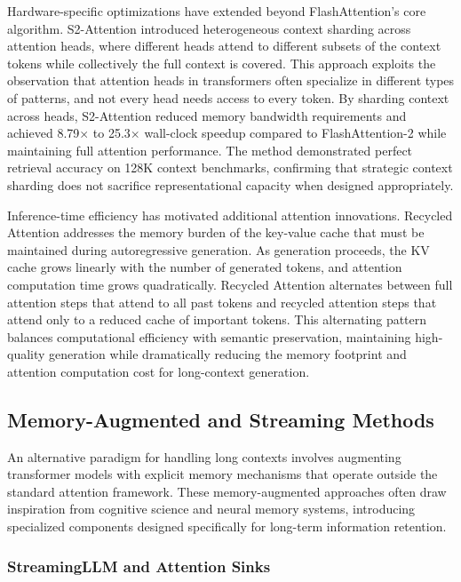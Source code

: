 Hardware-specific optimizations have extended beyond FlashAttention's core algorithm. S2-Attention introduced heterogeneous context sharding across attention heads, where different heads attend to different subsets of the context tokens while collectively the full context is covered. This approach exploits the observation that attention heads in transformers often specialize in different types of patterns, and not every head needs access to every token. By sharding context across heads, S2-Attention reduced memory bandwidth requirements and achieved 8.79$\times$ to 25.3$\times$ wall-clock speedup compared to FlashAttention-2 while maintaining full attention performance. The method demonstrated perfect retrieval accuracy on 128K context benchmarks, confirming that strategic context sharding does not sacrifice representational capacity when designed appropriately.

Inference-time efficiency has motivated additional attention innovations. Recycled Attention addresses the memory burden of the key-value cache that must be maintained during autoregressive generation. As generation proceeds, the KV cache grows linearly with the number of generated tokens, and attention computation time grows quadratically. Recycled Attention alternates between full attention steps that attend to all past tokens and recycled attention steps that attend only to a reduced cache of important tokens. This alternating pattern balances computational efficiency with semantic preservation, maintaining high-quality generation while dramatically reducing the memory footprint and attention computation cost for long-context generation.

\subsection{Memory-Augmented and Streaming Methods}

An alternative paradigm for handling long contexts involves augmenting transformer models with explicit memory mechanisms that operate outside the standard attention framework. These memory-augmented approaches often draw inspiration from cognitive science and neural memory systems, introducing specialized components designed specifically for long-term information retention.

\subsubsection{StreamingLLM and Attention Sinks}

